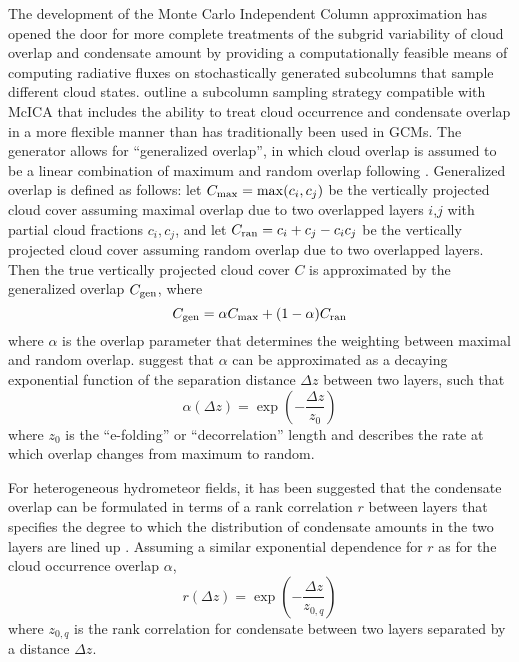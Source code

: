 \documentclass{article}
\begin{document}
The development of the Monte Carlo Independent Column approximation \citep[McICA;][]{pincus_et_al_2003} has opened the door for more complete treatments of the subgrid variability of cloud overlap and condensate amount by providing a computationally feasible means of computing radiative fluxes on stochastically generated subcolumns that sample different cloud states. \cite{raisanen_et_al_2004} outline a subcolumn sampling strategy compatible with McICA that includes the ability to treat cloud occurrence and condensate overlap in a more flexible manner than has traditionally been used in GCMs. The \cite{raisanen_et_al_2004} generator allows for ``generalized overlap'', in which cloud overlap is assumed to be a linear combination of maximum and random overlap following \cite{hogan_and_illingworth_2000}. Generalized overlap is defined as follows: let $C_{\rm max} = \max(c_i,c_j)$ be the vertically projected cloud cover assuming maximal overlap due to two overlapped layers $i$,$j$ with partial cloud fractions $c_i,c_j$, and let $C_{\rm ran} = c_i + c_j - c_i c_j$ be the vertically projected cloud cover assuming random overlap due to two overlapped layers. Then the true vertically projected cloud cover $C$ is approximated by the generalized overlap $C_{\rm gen}$, where
\[
    C_{\rm gen} = \alpha C_{\rm max} + (1 - \alpha) C_{\rm ran}
\]
where $\alpha$ is the overlap parameter that determines the weighting between maximal and random overlap. \cite{hogan_and_illingworth_2000} suggest that $\alpha$ can be approximated as a decaying exponential function of the separation distance $\Delta z$  between two layers, such that
\[
    \alpha(\Delta z) = \exp\left(-\frac{\Delta z}{z_0}\right)
\]
where $z_0$ is the ``e-folding'' or ``decorrelation'' length and describes the rate at which overlap changes from maximum to random.

For heterogeneous hydrometeor fields, it has been suggested that the condensate overlap can be formulated in terms of a rank correlation $r$ between layers that specifies the degree to which the distribution of condensate amounts in the two layers are lined up \citep[e.g.,][]{raisanen_et_al_2004,pincus_et_al_2005}. Assuming a similar exponential dependence for $r$ as for the cloud occurrence overlap $\alpha$,
\[
    r(\Delta z) = \exp\left(-\frac{\Delta z}{z_{0,q}}\right)
\]
where $z_{0,q}$ is the rank correlation for condensate between two layers separated by a distance $\Delta z$.

\end{document}
